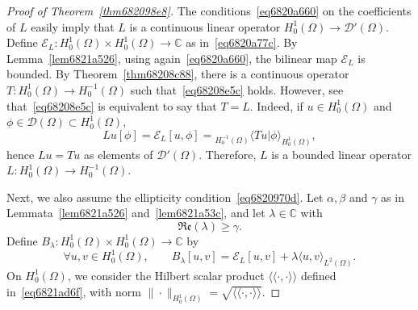 \documentclass[a4paper,9pt]{amsart}
\newcommand{\scr}[1]{\mathscr{#1}}
\newcommand{\frk}[1]{\mathfrak{#1}}
\newcommand{\C}{\mathbb{C}}	%
\newcommand{\real}{\frk{Re}}
\newcommand{\llangle}{\langle\!\langle}
\newcommand{\rrangle}{\rangle\!\rangle}
\theoremstyle{plain}
\theoremstyle{definition}
\theoremstyle{remark}
\begin{document}
\begin{proof}[Proof of Theorem~\ref{thm682098e8}]
	The conditions~\eqref{eq6820a660} on the coefficients of $L$ easily imply that $L$ is a continuous linear operator $H^1_0(\Omega)\to\scr D'(\Omega)$.
	Define $\scr E_L:H^1_0(\Omega)\times H^1_0(\Omega)\to\C$ as in~\eqref{eq6820a77c}.
	By Lemma~\ref{lem6821a526}, using again~\eqref{eq6820a660}, the bilinear map $\scr E_L$ is bounded.
	By Theorem~\ref{thm68208c88}, there is a continuous operator $T:H^1_0(\Omega)\to H^{-1}_0(\Omega)$ such that~\eqref{eq68208e5c} holds.
	However, see that~\eqref{eq68208e5c} is equivalent to say that $T=L$.
	Indeed, if $u\in H^1_0(\Omega)$ and $\phi\in\scr D(\Omega)\subset H^1_0(\Omega)$,
	\begin{equation}
		Lu[\phi]
		= \scr E_L[u,\phi]
		= {}_{H^{-1}_0(\Omega)}\langle Tu | \phi \rangle_{H^1_0(\Omega)} ,
	\end{equation}
	hence $Lu=Tu$ as elements of $\scr D'(\Omega)$.
	Therefore, $L$ is a bounded linear operator $L:H^1_0(\Omega)\to H^{-1}_0(\Omega)$.
	
	Next, we also assume the ellipticity condition~\eqref{eq6820970d}.
	Let $\alpha,\beta$ and $\gamma$ as in Lemmata~\ref{lem6821a526} and~\ref{lem6821a53c}, and let $\lambda\in\C$ with
	\begin{equation}\label{eq6820c2ce}
		\real(\lambda) \ge \gamma .
	\end{equation}
	Define $B_\lambda:H^1_0(\Omega)\times H^1_0(\Omega)\to\C$ by
	\begin{equation}
		\forall u,v\in H^1_0(\Omega),\qquad
		B_\lambda[u,v] = \scr E_L[u,v] + \lambda \langle u,v \rangle_{L^2(\Omega)} .
	\end{equation}
	On $H^1_0(\Omega)$, we consider the Hilbert scalar product $\llangle \cdot,\cdot \rrangle$
	defined in~\eqref{eq6821ad6f}, with norm $\|\cdot\|_{H^1_0(\Omega)} = \sqrt{\llangle \cdot,\cdot \rrangle}$.
	

\end{proof}
\end{document}

